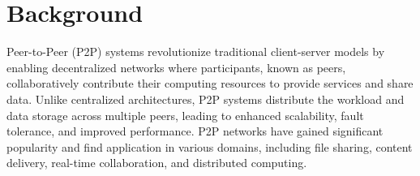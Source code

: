 \documentclass[10pt, conference]{IEEEtran}
\begin{document}


\section{Background}\label{sec:background}
Peer-to-Peer (P2P) systems revolutionize traditional client-server models by enabling decentralized networks where participants, known as peers, collaboratively contribute their computing resources to provide services and share data. Unlike centralized architectures, P2P systems distribute the workload and data storage across multiple peers, leading to enhanced scalability, fault tolerance, and improved performance. P2P networks have gained significant popularity and find application in various domains, including file sharing, content delivery, real-time collaboration, and distributed computing.
\end{document}
